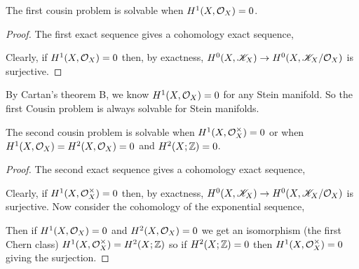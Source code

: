 \documentclass[12pt]{article}
\begin{document}
\begin{theorem}
The first cousin problem is solvable when $H^1(X, \mathcal{O}_{X}) = 0$. 
\end{theorem}

\begin{proof}
The first exact sequence gives a cohomology exact sequence,
\begin{center}
\end{center}
Clearly, if $H^1(X, \mathcal{O}_{X}) = 0$ then, by exactness, $H^0(X, \mathscr{K}_X) \to H^0(X, \mathscr{K}_X / \mathcal{O}_{X})$ is surjective. 
\end{proof}

\begin{rmk}
By Cartan's theorem B, we know $H^1(X, \mathcal{O}_{X}) = 0$ for any Stein manifold. So the first Cousin problem is always solvable for Stein manifolds.
\end{rmk}

\begin{theorem}
The second cousin problem is solvable when $H^1(X, \mathcal{O}_{X}^\times) = 0$ or when $H^1(X, \mathcal{O}_{X}) = H^2(X, \mathcal{O}_{X}) = 0$ and $H^2(X; \mathbb{Z}) = 0$.
\end{theorem}

\begin{proof}
The second exact sequence gives a cohomology exact sequence,
\begin{center}
\end{center}
Clearly, if $H^1(X, \mathcal{O}_{X}^\times) = 0$ then, by exactness, $H^0(X, \mathscr{K}_X) \to H^0(X, \mathscr{K}_X / \mathcal{O}_{X})$ is surjective. Now consider the cohomology of the exponential sequence,
\begin{center}
\end{center}
Then if $H^1(X, \mathcal{O}_{X}) = 0$ and $H^2(X, \mathcal{O}_{X}) = 0$ we get an isomorphism (the first Chern class) $H^1(X, \mathcal{O}_{X}^\times) = H^2(X; \mathbb{Z})$ so if $H^2(X; \mathbb{Z}) = 0$ then $H^1(X, \mathcal{O}_{X}^\times) = 0$ giving the surjection. 
\end{proof}
\end{document}
